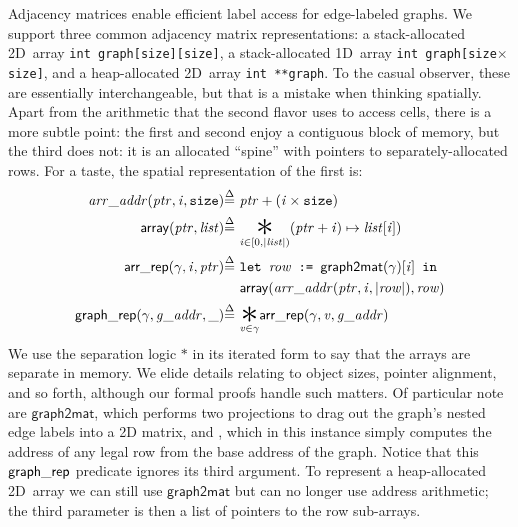 Adjacency matrices enable efficient label access for edge-labeled graphs.
We support three common
adjacency matrix representations:
a stack-allocated 2D~array \texttt{int~graph[size][size]},
a stack-allocated 1D~array \texttt{int~graph[size$\times$size]},
and a heap-allocated 2D~array \texttt{int~**graph}.
To the casual observer, these are essentially interchangeable, but
that is a mistake when thinking spatially. Apart from the
arithmetic that the second flavor uses to access cells, there is a
more subtle point: the first and second enjoy a contiguous block of
memory, but the third does not: it is an allocated ``spine'' with pointers to separately-allocated rows.
For a taste, the spatial representation of the first is:
\vspace{-0.5em}
\begin{equation*}
\begin{split}
\m{arr\_addr} (\m{ptr}, \m{i},\texttt{size}) \defeq~&
  \m{ptr} + (\m{i} \times \hide{\texttt{sizeof}(\texttt{int}) \times} \texttt{size}) \\
\mathsf{array}(\m{ptr},\m{list}) \defeq~& \underset{\m{i} \in [0, \lvert\m{list}\rvert)}{\bigstar} (\m{ptr} + \m{i}) \mapsto \m{list}[\m{i}]) \\
\p{arr\_rep}(\gamma, \m{i}, \m{ptr}) \defeq~& \texttt{let }\m{row} \texttt{ := }\mathsf{graph2mat}(\gamma)[\m{i}] \texttt{ in } \\
&\mathsf{array}(\m{arr\_addr}(\m{ptr},\m{i},\lvert\m{row}\rvert), \m{row}) \\
\vspace{1em}
\p{graph\_rep}(\gamma, \m{g\_addr}, \_) \defeq~& \underset{\m{v} \in \gamma}{\bigstar} \p{arr\_rep}(\gamma, \m{v}, \m{g\_addr})
\end{split}
\end{equation*}
We use the separation logic $\ast$ in its iterated form
to say that the arrays are separate in memory.  We elide details relating to object sizes, pointer alignment, and so forth, although our formal proofs handle such matters.
Of particular note are $\mathsf{graph2mat}$, which performs two projections to
drag out the graph's nested edge labels into a 2D matrix, and
, which in this instance simply computes
the address of any legal row  from the base address of the graph.
Notice that this $\mathsf{graph\_rep}$ predicate ignores its third argument.
To represent a heap-allocated 2D~array we can still use $\mathsf{graph2mat}$
but can no longer use address arithmetic; the third
parameter is then a list of pointers to the row sub-arrays.

